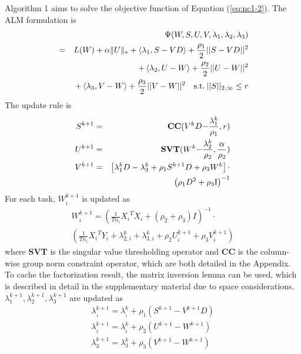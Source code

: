 \documentclass[twoside,leqno,twocolumn]{article}
\begin{document}
Algorithm 1 aims to solve the objective function of Equation (\ref{eq:nc1-2}).
The ALM formulation is 
\begin{eqnarray}
\nonumber
&& \Psi (W,S,U,V,{\lambda _1},{\lambda _2},{\lambda _3})\\
\nonumber
&=& L(W)+\alpha\|U\|_{*}+ \left\langle {{\lambda _1},S - VD} \right\rangle  + \frac{{{\rho _1}}}{2}||S - VD|{|^2}\\
\nonumber
&& +\left\langle {{\lambda_{2}},U-W}\right\rangle +\frac{{\rho_{2}}}{2}||U-W||^{2}\\
\nonumber
&& +\left\langle {{\lambda_{3}},V-W}\right\rangle +\frac{{\rho_{3}}}{2}||V-W||^{2}
\quad{\rm s.t.}\:||S|{|_{2,\infty}\leq r}
\label{eq:nc1-admm}
\end{eqnarray}
%
The update rule is
%
\begin{eqnarray}
\label{eq:admm1}
\nonumber
{S^{k+1}} &=& {\bf{CC}}({V^k}D{\rm{ - }}\frac{{\lambda ^k_1}}{{{\rho _1}}},r)\\
\nonumber
{U^{k+1}} &=& {\bf{SVT}}({W^k}{\rm{ - }}\frac{{\lambda ^k_2}}{{{\rho _2}}},\frac{\alpha }{{{\rho _2}}})\\
\nonumber
{V^{k+1}} &=& \left[ {{\lambda ^k_1}D - \lambda ^k_3 + {\rho _1}{S^{k + 1}}D + {\rho _3}{W^k}} \right] \cdot \\
&&{\left({{\rho_{1}}{D^{2}}+{\rho_{3}}{\rm {I}}}\right)^{-1}}
\end{eqnarray}
For each task, $W^{k+1}_{i}$ is updated as
%
\begin{equation}
\begin{array}{l}
W_i^{k + 1} = {(\frac{1}{{T{n_i}}}{X_i}^T{X_i} + ({\rho _2} + {\rho _3})I)^{ - 1}} \cdot \\
\left(\frac{1}{{T{n_i}}}{X_i}^T{Y_i} + {\lambda^k _{2,i}} + {\lambda^k _{3,i}} + {\rho _2}U_i^{k + 1} + {\rho _3}V_i^{k + 1}\right)
\end{array}
\label{eq:nc1-w}
\end{equation}
%
where \textbf{SVT} is the singular value thresholding operator and \textbf{CC} is the column-wise group norm constraint operator, which are both detailed in the Appendix.
To cache the factorization result, the matrix inversion lemma can be used,
which is described in detail in the supplementary material due to space considerations. 
${\lambda^{k + 1}_{1}}, {\lambda^{k + 1}_{2}}, {\lambda^{k + 1}_{3}}$ are updated as
\begin{equation}
\begin{array}{*{20}{l}}
{\lambda _{_1}^{k + 1} = \lambda _{_1}^k + {\rho _1}({S^{k + 1}} - {V^{k + 1}}D)}\\
{\lambda _{_2}^{k + 1} = \lambda _{_2}^k + {\rho _2}({U^{k + 1}} - {W^{k + 1}})}\\
{\lambda _3^{k + 1} = \lambda _3^k + {\rho _3}({V^{k + 1}} - {W^{k + 1}})}
\end{array}
\label{eq:lambda1}
\end{equation}
\end{document}
